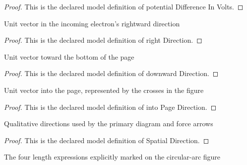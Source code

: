 \begin{proof}
  This is the declared model definition of potential Difference In Volts.
\end{proof}
\begin{definition}
  \label{def:physics:phyx-mini-0634:phyxminiproblems-problemphyxmini0634-rightdirection}
  Unit vector in the incoming electron's rightward direction
\end{definition}
\begin{proof}
  This is the declared model definition of right Direction.
\end{proof}
\begin{definition}
  \label{def:physics:phyx-mini-0634:phyxminiproblems-problemphyxmini0634-downwarddirection}
  Unit vector toward the bottom of the page
\end{definition}
\begin{proof}
  This is the declared model definition of downward Direction.
\end{proof}
\begin{definition}
  \label{def:physics:phyx-mini-0634:phyxminiproblems-problemphyxmini0634-intopagedirection}
  Unit vector into the page, represented by the crosses in the figure
\end{definition}
\begin{proof}
  This is the declared model definition of into Page Direction.
\end{proof}
\begin{definition}
  \label{def:physics:phyx-mini-0634:phyxminiproblems-problemphyxmini0634-spatialdirection}
  Qualitative directions used by the primary diagram and force arrows
\end{definition}
\begin{proof}
  This is the declared model definition of Spatial Direction.
\end{proof}
\begin{definition}
  \label{def:physics:phyx-mini-0634:phyxminiproblems-problemphyxmini0634-figurelengthlabel}
  The four length expressions explicitly marked on the circular-arc figure
\end{definition}
